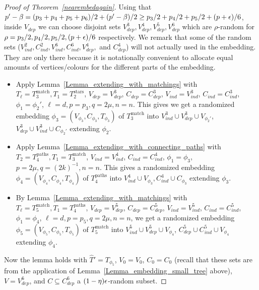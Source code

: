 \begin{proof}[Proof of Theorem~\ref{nearembedagain}]
Using that $p'-\beta= (p_3+p_4+p_5+p_6)/2 + (p'-\beta)/2\geq p_3/2+p_4/2+p_5/2+ (p+\epsilon)/6$, inside $V_{dep}$ we can choose disjoint sets $V_{dep}^3, V_{dep}^4, V_{dep}^5, V_{dep}^6$ which are $\rho$-random for $\rho=p_3/2, p_4/2, p_5/2, (p+\epsilon)/6$ respectively. We remark that some of the random sets ($V_{ind}^2, C_{ind}^2, V_{ind}^6, C_{ind}^6, V_{dep}^4,$ and $C_{dep}^4$) will not actually used in the embedding. They are only there because it is notationally convenient to allocate equal amounts of vertices/colours for the different parts of the embedding.
\begin{itemize}
\item Apply Lemma~\ref{Lemma_extending_with_matchings} with $T_{\ell}=T_3^{\mathrm{match}}, T_1=T_{2}^{\mathrm{stars}}$, $V_{dep}=V_{dep}^3$, $C_{dep}=C_{dep}^3$, $V_{ind}=V_{ind}^3$, $C_{ind}=C_{ind}^3$, $\phi_1=\phi_2'$, $\ell=d, p=p_3, q=2\mu, n=n$. This gives we get a  randomized embedding $\phi_3=(V_{\phi_3}, C_{\phi_3}, T_{\phi_3})$  of $T_3^{\mathrm{match}}$ into $V^3_{ind}\cup V^3_{dep}\cup V_{\phi_2'}$, $V^3_{dep}\cup  V^3_{ind}\cup C_{\phi_2'}$ extending  $\phi_2$.
\item Apply Lemma~\ref{Lemma_extending_with_connecting_paths} with $T_2=T_4^{\mathrm{paths}}, T_1=T_{3}^{\mathrm{match}}$, $V_{ind}=V_{ind}^4$, $C_{ind}=C_{ind}^4$, $\phi_1=\phi_3$, $p=2\mu, q=(2k)^{-1}, n=n$. This gives a  randomized embedding $\phi_4=(V_{\phi_4}, C_{\phi_4}, T_{\phi_4})$  of $T_4^{\mathrm{paths}}$ into $V^4_{ind}\cup V_{\phi_3}, C^4_{ind}\cup C_{\phi_3}$ extending  $\phi_3$.
\item By Lemma~\ref{Lemma_extending_with_matchings} with $T_{\ell}=T_5^{\mathrm{match}}, T_1=T_{4}^{\mathrm{paths}}$, $V_{dep}=V_{dep}^5$, $C_{dep}=C_{dep}^5$, $V_{ind}=V_{ind}^5$, $C_{ind}=C_{ind}^5$, $\phi_1=\phi_4$, $\ell=d, p=p_5, q=2\mu, n=n$, we get a  randomized embedding $\phi_5=(V_{\phi_5}, C_{\phi_5}, T_{\phi_5})$  of $T_5^{\mathrm{match}}$ into $V^5_{ind}\cup V^5_{dep}\cup V_{\phi_4}$, $C^5_{dep}\cup  C^5_{ind}\cup V_{\phi_4}$ extending  $\phi_4$.
\end{itemize}
Now the lemma holds with $\hat T'=T_{\phi_5}$, $V_0=V_0$, $C_0=C_0$ (recall that these sets are from the application of Lemma~\ref{Lemma_embedding_small_tree} above),  $V=V_{dep}^6$, and $C\subseteq C_{dep}^6$ a $(1-\eta)\epsilon$-random subset. 
\end{proof}

